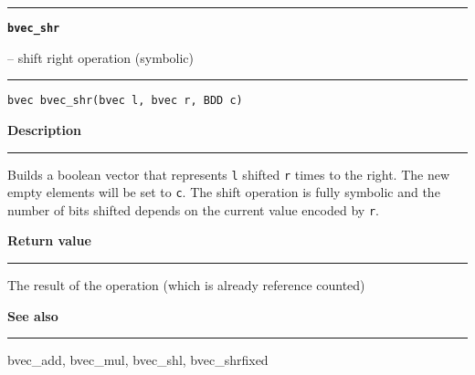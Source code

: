 \begin{minipage}{\textwidth}

\noindent\begin{minipage}{\textwidth}
\rule{\textwidth}{0.5mm}
{\tt\bf bvec\_shr }
\--- shift right operation (symbolic)  \hspace{\fill}
\\\rule[1.5ex]{\textwidth}{0.5mm}
\end{minipage}

\noindent\begin{verbatim}
bvec bvec_shr(bvec l, bvec r, BDD c) 
\end{verbatim}

\vspace{\parsep}\noindent
{\bf Description}\\\rule[1.5ex]{\textwidth}{0.2mm}\vspace{-1.5ex}\setlength{\parindent}{1em}
Builds a boolean vector that represents {\tt l} shifted {\tt r}
           times to the right. The new empty elements will be set to {\tt c}.
	   The shift operation is fully symbolic and the number of bits
	   shifted depends on the current value encoded by {\tt r}. 

\setlength{\parindent}{0em}\vspace{\parsep}\vspace{\baselineskip}\noindent
{\bf Return value}\\\rule[1.5ex]{\textwidth}{0.2mm}\vspace{-1.5ex}
The result of the operation (which is already reference counted) 

\vspace{\parsep}\vspace{\baselineskip}\noindent
{\bf See also}\\\rule[1.5ex]{\textwidth}{0.2mm}\vspace{-1.5ex}
bvec\_add, bvec\_mul, bvec\_shl, bvec\_shrfixed 
\end{minipage}
\vspace{8ex}
